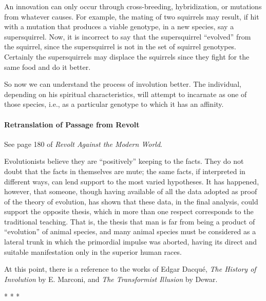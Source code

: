 An innovation can only occur through cross-breeding, hybridization, or mutations from whatever causes. For example, the mating of two squirrels may result, if hit with a mutation that produces a viable genotype, in a new species, say a supersquirrel. Now, it is incorrect to say that the supersquirrel ``evolved'' from the squirrel, since the supersquirrel is not in the set of squirrel genotypes. Certainly the supersquirrels may displace the squirrels since they fight for the same food and do it better.

So now we can understand the process of involution better. The individual, depending on his spiritual characteristics, will attempt to incarnate as one of those species, i.e., as a particular genotype to which it has an affinity.

\paragraph{Retranslation of Passage from Revolt}


See page 180 of \textit{Revolt Against the Modern World}.

\begin{quotex}
Evolutionists believe they are ``positively'' keeping to the facts. They do not doubt that the facts in themselves are mute; the same facts, if interpreted in different ways, can lend support to the most varied hypotheses. It has happened, however, that someone, though having available of all the data adopted as proof of the theory of evolution, has shown that these data, in the final analysis, could support the opposite thesis, which in more than one respect corresponds to the traditional teaching. That is, the thesis that man is far from being a product of ``evolution'' of animal species, and many animal species must be considered as a lateral trunk in which the primordial impulse was aborted, having its direct and suitable manifestation only in the superior human races.
\end{quotex}


At this point, there is a reference to the works of Edgar Dacqué, \textit{The History of Involution} by E. Marconi, and \textit{The Transformist Illusion} by Dewar.



\begin{center}* * *\end{center}

